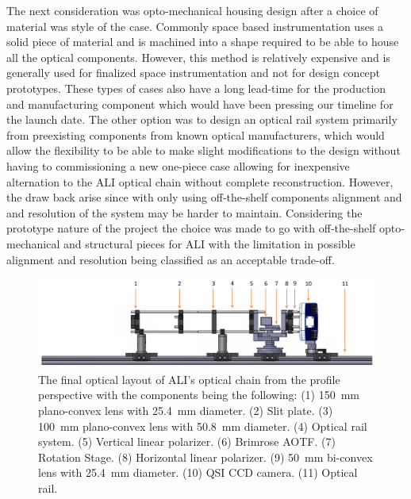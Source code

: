 The next consideration was opto-mechanical housing design after a choice of material was style of the case. Commonly space based instrumentation uses a solid piece of material and is machined into a shape required to be able to house all the optical components. However, this method is relatively expensive and is generally used for finalized space instrumentation and not for design concept prototypes. These types of cases also have a long lead-time for the production and manufacturing component which would have been pressing our timeline for the launch date. The other option was to design an optical rail system primarily from preexisting components from known optical manufacturers, which would allow the flexibility to be able to make slight modifications to the design without having to commissioning a new one-piece case allowing for inexpensive alternation to the ALI optical chain without complete reconstruction. However, the draw back arise since with only using off-the-shelf components alignment and and resolution of the system may be harder to maintain. Considering the prototype nature of the project the choice was made to go with off-the-shelf opto-mechanical and structural pieces for ALI with the limitation in possible alignment and resolution being classified as an acceptable trade-off.

\begin{figure}
    \begin{center}
    \includegraphics[width=1.0\textwidth]{./Images/3-3-OptoMechanicalSolidWorksLayoutProfile.pdf}
    \caption[ALI's Opto-mechanical Layout (Side)]{The final optical layout of ALI's optical chain from the profile perspective with the components being the following: (1) 150~mm plano-convex lens with 25.4~mm diameter. (2) Slit plate. (3) 100~mm plano-convex lens with 50.8~mm diameter. (4) Optical rail system. (5) Vertical linear polarizer. (6) Brimrose AOTF. (7) Rotation Stage. (8) Horizontal linear polarizer. (9) 50~mm bi-convex lens with 25.4~mm diameter. (10) QSI CCD camera. (11) Optical rail.}
   \label{fig:3.3:optoMechanicDesignSide}
    \end{center}
\end{figure}

